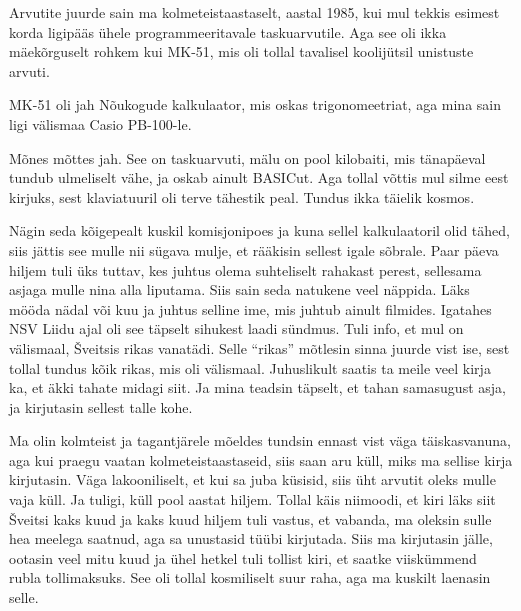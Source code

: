 \label{sisu:tonu}


Arvutite juurde sain ma kolmeteistaastaselt, aastal 1985, kui mul tekkis 
esimest korda ligipääs ühele programmeeritavale 
taskuarvutile. Aga see oli ikka mäekõrguselt rohkem kui 
MK-51, mis oli tollal 
tavalisel koolijütsil unistuste arvuti. 


MK-51 oli jah Nõukogude kalkulaator, mis oskas trigonomeetriat, aga mina sain 
ligi välismaa Casio PB-100-le. 


Mõnes mõttes jah. See on taskuarvuti, mälu on pool kilobaiti, mis 
tänapäeval tundub ulmeliselt vähe, ja oskab ainult BASICut. Aga tollal võttis mul 
silme eest kirjuks, sest klaviatuuril oli terve tähestik peal. 
Tundus ikka täielik kosmos. 


Nägin seda kõigepealt kuskil komisjonipoes 
ja kuna sellel kalkulaatoril olid tähed, siis jättis see mulle
nii sügava mulje, et rääkisin sellest igale sõbrale. Paar 
päeva hiljem tuli üks tuttav, kes juhtus olema suhteliselt rahakast perest, sellesama asjaga mulle nina alla liputama.
Siis sain seda natukene veel näppida. Läks mööda nädal või kuu ja juhtus selline ime, mis juhtub ainult filmides. Igatahes NSV Liidu 
ajal oli see täpselt sihukest laadi sündmus. Tuli info, et mul on välismaal, Šveitsis 
rikas vanatädi. Selle \enquote{rikas} mõtlesin sinna juurde vist ise, sest tollal 
tundus kõik rikas, mis oli välismaal. Juhuslikult saatis ta meile veel kirja ka, 
et äkki tahate midagi siit. Ja mina teadsin täpselt, et tahan 
samasugust asja, ja kirjutasin sellest talle kohe.

Ma olin kolmteist ja tagantjärele mõeldes tundsin ennast vist
väga täiskasvanuna, aga kui praegu vaatan kolmeteistaastaseid, siis saan 
aru küll, miks ma sellise kirja kirjutasin. Väga lakooniliselt, et kui sa juba 
küsisid, siis üht arvutit oleks mulle vaja küll. Ja tuligi, küll 
pool aastat hiljem. Tollal käis niimoodi, et kiri läks siit Šveitsi kaks kuud ja 
kaks kuud hiljem tuli vastus, et vabanda, ma oleksin sulle hea meelega saatnud, aga sa unustasid tüübi kirjutada. Siis 
ma kirjutasin jälle, ootasin veel mitu kuud ja ühel hetkel tuli 
tollist kiri, et saatke viiskümmend rubla tollimaksuks. See oli tollal 
kosmiliselt suur raha, aga
ma kuskilt laenasin selle. 

